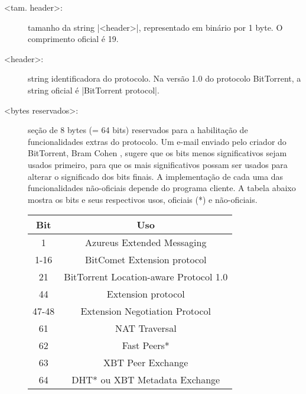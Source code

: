 \begin{description}
    \item[<tam. header>:] tamanho da string \bverb|<header>|, representado em binário
        por 1 byte. O comprimento oficial é 19.

    \item[<header>:] \gls*{string} identificadora do protocolo. Na versão 1.0 do
        protocolo BitTorrent, a \gls*{string} oficial é \sverb|BitTorrent protocol|.

    \newpage
    \item[<bytes reservados>:] seção de 8 bytes (= 64 bits) reservados para a
        habilitação de funcionalidades extras do protocolo. Um e-mail enviado pelo
        criador do BitTorrent, Bram Cohen \cite{wikitheory:reserved-bytes}, sugere que
        os bits menos significativos sejam usados primeiro, para que os mais
        significativos possam ser usados para alterar o significado dos bits finais. A
        implementação de cada uma das funcionalidades não-oficiais depende do programa
        cliente. A tabela abaixo mostra os bits e seus respectivos usos, oficiais (*)
        e não-oficiais.

        \begin{center}
            \begin{tabular}{ | c | c |}
            \hline
            \textbf{Bit} & \textbf{Uso}                         \\ \hline
            1       & Azureus Extended Messaging                \\ \hline
            1-16    & BitComet Extension protocol               \\ \hline
            21      & BitTorrent Location-aware Protocol 1.0    \\ \hline
            44      & Extension protocol                        \\ \hline
            47-48   & Extension Negotiation Protocol            \\ \hline
            61      & NAT Traversal                             \\ \hline
            62      & Fast Peers*                               \\ \hline
            63      & XBT Peer Exchange                         \\ \hline
            64      & DHT* ou XBT Metadata Exchange             \\ \hline
            \end{tabular}
        \end{center}


\end{description}
